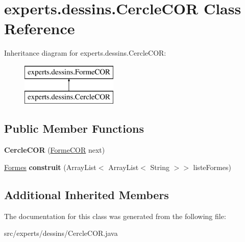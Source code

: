 \hypertarget{classexperts_1_1dessins_1_1_cercle_c_o_r}{}\section{experts.\+dessins.\+Cercle\+C\+OR Class Reference}
\label{classexperts_1_1dessins_1_1_cercle_c_o_r}
Inheritance diagram for experts.\+dessins.\+Cercle\+C\+OR\+:\begin{figure}[H]
\begin{center}
\leavevmode
\includegraphics[height=2.000000cm]{classexperts_1_1dessins_1_1_cercle_c_o_r}
\end{center}
\end{figure}
\subsection*{Public Member Functions}
\begin{DoxyCompactItemize}
\item 
\mbox{\label{classexperts_1_1dessins_1_1_cercle_c_o_r_a7c0fc61a749f55ff8bbdd59ca92a7f04}} 
{\bfseries Cercle\+C\+OR} (\mbox{\hyperlink{classexperts_1_1dessins_1_1_forme_c_o_r}{Forme\+C\+OR}} next)
\item 
\mbox{\label{classexperts_1_1dessins_1_1_cercle_c_o_r_a79d577f058d61b76c25245e5d4d1f022}} 
\mbox{\hyperlink{classdessin_1_1_formes}{Formes}} {\bfseries construit} (Array\+List$<$ Array\+List$<$ String $>$$>$ liste\+Formes)
\end{DoxyCompactItemize}
\subsection*{Additional Inherited Members}


The documentation for this class was generated from the following file\+:\begin{DoxyCompactItemize}
\item 
src/experts/dessins/Cercle\+C\+O\+R.\+java\end{DoxyCompactItemize}

